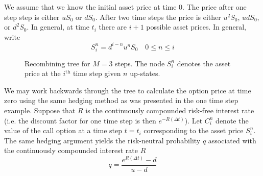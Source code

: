 \documentclass[12pt]{article}
\newlength\tindent
\renewcommand{\indent}{\hspace*{\tindent}}
\begin{document}
\indent We assume that we know the initial asset price at time 0. The price after one step step is either $uS_0$ or $dS_0$. After two time steps the price is either $u^2S_0$, $udS_0$, or $d^2S_0$. In general, at time $t_i$ there are $i + 1$ possible asset prices. In general, write
\begin{equation*}
	S^n_i = d^{i - n}u^n S_0 \quad 0 \leq n \leq i
\end{equation*}

\begin{figure}[H]
\begin{center}
\end{center}
\caption{Recombining tree for $M = 3$ steps. The node $S^n_i$ denotes the asset price at the $i^\text{th}$ time step given $n$ up-states.}
\end{figure}

\indent We may work backwards through the tree to calculate the option price at time zero using the same hedging method as was presented in the one time step example. Suppose that $R$ is the continuously compounded risk-free interest rate (i.e. the discount factor for one time step is then $e^{-R(\Delta t)}$). Let $C^n_i$ denote the value of the call option at a time step $t = t_i$ corresponding to the asset price $S^n_i$. The same hedging argument yields the risk-neutral probability $q$ associated with the continuously compounded interest rate $R$
\begin{equation*}
	q = \frac{e^{R(\Delta t)} - d}{u - d}
\end{equation*}
\end{document}
